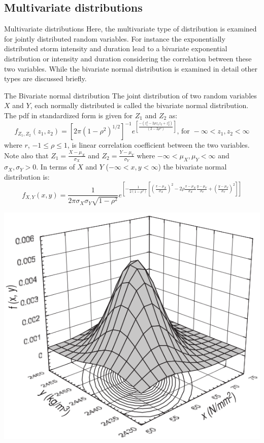 \documentclass[8pt]{beamer}
\renewcommand{\emph}[1]{\textcolor{myorange}{#1}}
\begin{document}
\subsection{Multivariate distributions} %
\begin{frame}{Multivariate distributions} 
    Here, the multivariate type of distribution is examined for jointly distributed random variables. For instance the exponentially distributed storm intensity and duration lead to a \emph{bivariate exponential distribution} or intensity and duration considering the correlation between these two variables. While the \emph{bivariate normal distribution} is examined in detail other types are discussed briefly.
    \begin{block}{The \alert{Bivariate normal} distribution}
        The \emph{joint distribution} of two random variables $X$ and $Y$, each normally distributed is called the \alert{bivariate normal distribution}. The \emph{pdf} in standardized form is given for $Z_1$ and $Z_2$ as:
        \vspace{-15pt}
        \[
            f_{Z_1 , Z_2} (z_1 , z_2) = \left[ 2\pi \left( 1- \rho^2 \right)^{1/2} \right]^{-1} e^{\left[ \frac{-\left( z_1^2 - 2\rho z_1 z_2 + z_2^2 \right)}{\left( 2- 2\rho^2 \right)} \right]}, \, \text{for } -\infty < z_1 , z_2 < \infty
            \]
            where $r$, $-1 \leq \rho \leq 1$, is linear correlation coefficient between the two variables. Note also that $Z_1 = \frac{X - \mu_X}{\sigma_X}$ and $Z_2 = \frac{Y - \mu_Y}{\sigma_Y}$ where $-\infty < \mu_X , \mu_Y < \infty$ and $\sigma_X , \sigma_Y > 0 $. In terms of $X$ and $Y$ ($-\infty < x , y < \infty$) the \alert{bivariate normal distribution} is:
        \vspace{-5pt}
        \[
            f_{X , Y} (x , y) = \frac{1}{2 \pi \sigma_X \sigma_Y \sqrt{1- \rho^2}} e^{\left[ -\frac{1}{2(1-\rho^2)} \left[ \left(\frac{x-\mu_X}{\sigma_X}\right)^2 - 2\rho \frac{x-\mu_X}{\sigma_X} \frac{y-\mu_Y}{\sigma_Y} +  \left(\frac{y-\mu_Y}{\sigma_Y}\right)^2 \right] \right]}             
        \]
   \end{block}
   \vspace{-15pt}
\begin{minipage}{0.37\textwidth}
\centering
\includegraphics[width=0.8\linewidth]{fi431.png}  %

\end{minipage}
\end{frame}
\end{document}
